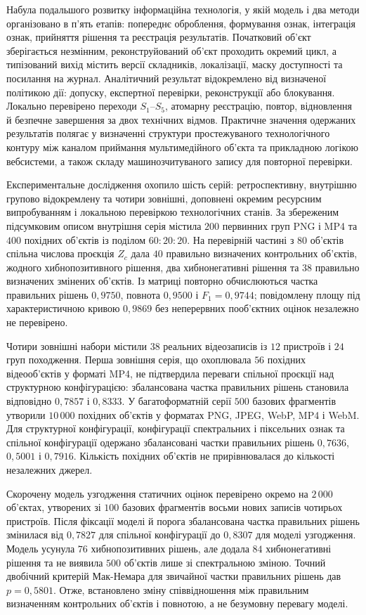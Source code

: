 Набула подальшого розвитку інформаційна технологія, у якій модель і два методи організовано в п’ять етапів: попереднє оброблення, формування ознак, інтеграція ознак, прийняття рішення та реєстрація результатів. Початковий об’єкт зберігається незмінним, реконструйований об’єкт проходить окремий цикл, а типізований вихід містить версії складників, локалізації, маску доступності та посилання на журнал. Аналітичний результат відокремлено від визначеної політикою дії: допуску, експертної перевірки, реконструкції або блокування. Локально перевірено переходи $S_1$--$S_5$, атомарну реєстрацію, повтор, відновлення й безпечне завершення за двох технічних відмов. Практичне значення одержаних результатів полягає у визначенні структури простежуваного технологічного контуру між каналом приймання мультимедійного об’єкта та прикладною логікою вебсистеми, а також складу машинозчитуваного запису для повторної перевірки.

Експериментальне дослідження охопило шість серій: ретроспективну, внутрішню групово відокремлену та чотири зовнішні, доповнені окремим ресурсним випробуванням і локальною перевіркою технологічних станів. За збереженим підсумковим описом внутрішня серія містила $200$ первинних груп PNG і MP4 та $400$ похідних об’єктів із поділом $60:20:20$. На перевірній частині з $80$ об’єктів спільна числова проєкція $Z_c$ дала $40$ правильно визначених контрольних об’єктів, жодного хибнопозитивного рішення, два хибнонегативні рішення та $38$ правильно визначених змінених об’єктів. Із матриці повторно обчислюються частка правильних рішень $0{,}9750$, повнота $0{,}9500$ і $F_1=0{,}9744$; повідомлену площу під характеристичною кривою $0{,}9869$ без неперервних пооб’єктних оцінок незалежно не перевірено.

Чотири зовнішні набори містили $38$ реальних відеозаписів із $12$ пристроїв і $24$ груп походження. Перша зовнішня серія, що охоплювала $56$ похідних відеооб’єктів у форматі MP4, не підтвердила переваги спільної проєкції над структурною конфігурацією: збалансована частка правильних рішень становила відповідно $0{,}7857$ і $0{,}8333$. У багатоформатній серії $500$ базових фрагментів утворили $10\,000$ похідних об’єктів у форматах PNG, JPEG, WebP, MP4 і WebM. Для структурної конфігурації, конфігурації спектральних і піксельних ознак та спільної конфігурації одержано збалансовані частки правильних рішень $0{,}7636$, $0{,}5001$ і $0{,}7916$. Кількість похідних об’єктів не прирівнювалася до кількості незалежних джерел.

Скорочену модель узгодження статичних оцінок перевірено окремо на $2\,000$ об’єктах, утворених зі $100$ базових фрагментів восьми нових записів чотирьох пристроїв. Після фіксації моделі й порога збалансована частка правильних рішень змінилася від $0{,}7827$ для спільної конфігурації до $0{,}8307$ для моделі узгодження. Модель усунула $76$ хибнопозитивних рішень, але додала $84$ хибнонегативні рішення та не виявила $500$ об’єктів лише зі спектральною зміною. Точний двобічний критерій Мак-Немара для звичайної частки правильних рішень дав $p=0{,}5801$. Отже, встановлено зміну співвідношення між правильним визначенням контрольних об’єктів і повнотою, а не безумовну перевагу моделі.

